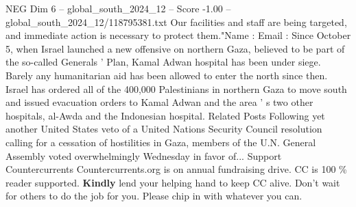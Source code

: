 \begin{textsample}{NEG Dim 6 – global\_south\_2024\_12 – Score -1.00 – global\_south\_2024\_12/118795381.txt}
Our facilities and staff are being targeted, and immediate action is necessary to protect them."Name : Email : Since October 5, when Israel launched a new offensive on northern Gaza, believed to be part of the so-called Generals ' Plan, Kamal Adwan hospital has been under siege.
Barely any humanitarian aid has been allowed to enter the north since then.
Israel has ordered all of the 400,000 Palestinians in northern Gaza to move south and issued evacuation orders to Kamal Adwan and the area ' s two other hospitals, al-Awda and the Indonesian hospital.
Related Posts Following yet another United States veto of a United Nations Security Council resolution calling for a cessation of hostilities in Gaza, members of the U.N.
General Assembly voted overwhelmingly Wednesday in favor of...
Support Countercurrents Countercurrents.org is on annual fundraising drive.
CC is 100 \% reader supported. \textbf{Kindly} lend your helping hand to keep CC alive.
Don't wait for others to do the job for you.
Please chip in with whatever you can.

\end{textsample}
